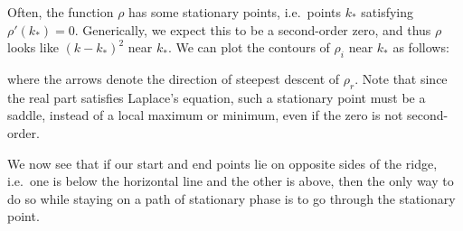 \documentclass[a4paper]{article}
\begin{document}
Often, the function $\rho$ has some stationary points, i.e.\ points $k_*$ satisfying $\rho'(k_*) = 0$. Generically, we expect this to be a second-order zero, and thus $\rho$ looks like $(k - k_*)^2$ near $k_*$. We can plot the contours of $\rho_i$ near $k_*$ as follows:
\begin{center}
\end{center}
where the arrows denote the direction of steepest descent of $\rho_r$. Note that since the real part satisfies Laplace's equation, such a stationary point must be a saddle, instead of a local maximum or minimum, even if the zero is not second-order.

We now see that if our start and end points lie on opposite sides of the ridge, i.e.\ one is below the horizontal line and the other is above, then the only way to do so while staying on a path of stationary phase is to go through the stationary point.
\end{document}
